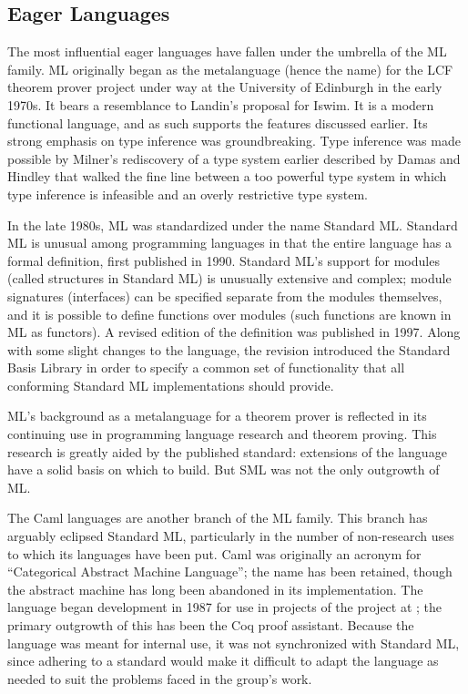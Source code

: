 \subsection{Eager Languages}
The most influential eager languages have fallen under the umbrella of the ML family. ML originally began as the metalanguage (hence the name) for the LCF theorem prover project under way at the University of Edinburgh in the early 1970s. It bears a resemblance to Landin's proposal for Iswim. It is a modern functional language, and as such supports the features discussed earlier. Its strong emphasis on type inference was groundbreaking. Type inference was made possible by Milner's rediscovery of a type system earlier described by Damas and Hindley that walked the fine line between a too powerful type system in which type inference is infeasible and an overly restrictive type system.

In the late 1980s, ML was standardized under the name Standard ML. Standard ML is unusual among programming languages in that the entire language has a formal definition, first published in 1990. Standard ML's support for modules (called structures in Standard ML) is unusually extensive and complex; module signatures (interfaces) can be specified separate from the modules themselves, and it is possible to define functions over modules (such functions are known in ML as functors). A revised edition of the definition was published in 1997. Along with some slight changes to the language, the revision introduced the Standard Basis Library in order to specify a common set of functionality that all conforming Standard ML implementations should provide.

ML's background as a metalanguage for a theorem prover is reflected in its continuing use in programming language research and theorem proving. This research is greatly aided by the published standard: extensions of the language have a solid basis on which to build. But SML was not the only outgrowth of ML.

The Caml languages are another branch of the ML family. This branch has arguably eclipsed Standard ML, particularly in the number of non-research uses to which its languages have been put. Caml was originally an acronym for ``Categorical Abstract Machine Language''; the name has been retained, though the abstract machine has long been abandoned in its implementation. The language began development in 1987 for use in projects of the  project at ; the primary outgrowth of this has been the Coq proof assistant. Because the language was meant for internal use, it was not synchronized with Standard ML, since adhering to a standard would make it difficult to adapt the language as needed to suit the problems faced in the group's work.

